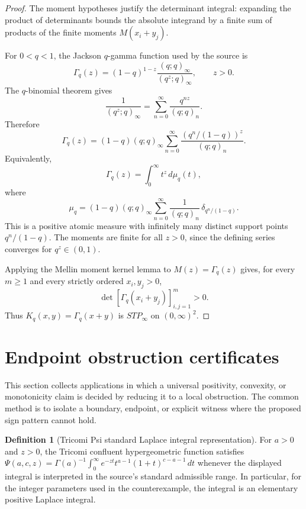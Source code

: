 \documentclass[11pt]{article}
\numberwithin{equation}{section}
\theoremstyle{definition}
\newtheorem{definition}{Definition}[section]
\theoremstyle{remark}
\newcommand{\1}{\mathbf 1}
\begin{document}
\begin{proof}
The moment hypotheses justify the determinant integral: expanding the product of determinants bounds the absolute integrand by a finite sum of products of the finite moments \(M(x_i+y_j)\).

For \(0<q<1\), the Jackson \(q\)-gamma function used by the source is
\[
\Gamma_q(z)=(1-q)^{1-z}\frac{(q;q)_\infty}{(q^z;q)_\infty},\qquad z>0.
\]
The \(q\)-binomial theorem gives
\[
\frac{1}{(q^z;q)_\infty}=\sum_{n=0}^{\infty}\frac{q^{nz}}{(q;q)_n}.
\]
Therefore
\[
\Gamma_q(z)=(1-q)(q;q)_\infty
\sum_{n=0}^{\infty}\frac{(q^n/(1-q))^z}{(q;q)_n}.
\]
Equivalently,
\[
\Gamma_q(z)=\int_0^\infty t^z\,d\mu_q(t),
\]
where
\[
\mu_q=(1-q)(q;q)_\infty
\sum_{n=0}^{\infty}\frac{1}{(q;q)_n}\,
\delta_{q^n/(1-q)}.
\]
This is a positive atomic measure with infinitely many distinct support points \(q^n/(1-q)\). The moments are finite for all \(z>0\), since the defining series converges for \(q^z\in(0,1)\).

Applying the Mellin moment kernel lemma to \(M(z)=\Gamma_q(z)\) gives, for every \(m\ge1\) and every strictly ordered \(x_i,y_j>0\),
\[
\det[\Gamma_q(x_i+y_j)]_{i,j=1}^m>0.
\]
Thus \(K_q(x,y)=\Gamma_q(x+y)\) is \(STP_\infty\) on \((0,\infty)^2\).
\end{proof}

\section{Endpoint obstruction certificates}
\label{sec:endpoint-obstruction-certificates}
This section collects applications in which a universal positivity, convexity, or monotonicity claim is decided by reducing it to a local obstruction.  The common method is to isolate a boundary, endpoint, or explicit witness where the proposed sign pattern cannot hold.

\begin{definition}[Tricomi Psi standard Laplace integral representation]
\label{res:tricomipsi-standardintegralrepresentation}
For \(a>0\) and \(z>0\), the Tricomi confluent hypergeometric function satisfies \(\Psi(a,c,z)=\Gamma(a)^{-1}\int_0^\infty e^{-zt}t^{a-1}(1+t)^{c-a-1}\,dt\) whenever the displayed integral is interpreted in the source's standard admissible range. In particular, for the integer parameters used in the counterexample, the integral is an elementary positive Laplace integral.
\end{definition}
\end{document}
